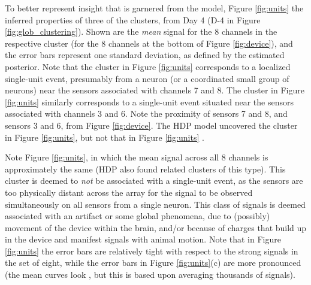 \documentclass[journal]{IEEEtran}
\begin{document}
To better represent insight that is garnered from the model,  Figure \ref{fig:units}  the inferred properties of three of the clusters, from Day 4 (D-4 in Figure \ref{fig:glob_clustering}). Shown are the \emph{mean} signal for the 8 channels in the respective cluster (for the 8 channels at the bottom of Figure \ref{fig:device}), and the error bars represent one standard deviation, as defined by the estimated posterior. Note that the cluster in  Figure \ref{fig:units} corresponds to a localized single-unit event, presumably from a neuron (or a coordinated small group of neurons) near the sensors associated with channels 7 and 8. The cluster in  Figure \ref{fig:units} similarly corresponds to a single-unit event situated near the sensors associated with channels 3 and 6. Note the proximity of sensors 7 and 8, and sensors 3 and 6, from Figure \ref{fig:device}. The HDP model uncovered the cluster in  Figure \ref{fig:units}, but not that in  Figure \ref{fig:units} .

Note  Figure \ref{fig:units}, in which the mean signal across all 8 channels is approximately the same (HDP also found related clusters of this type). This cluster is deemed to \emph{not} be associated with a single-unit event, as the sensors are too physically distant across the array for the signal to be observed simultaneously on all sensors from a single neuron. This class of signals is deemed associated with an artifact or some global phenomena, due to (possibly) movement of the device within the brain, and/or because of charges that build up in the device and manifest signals with animal motion. Note that in  Figure \ref{fig:units} the error bars are relatively tight with respect to the strong signals in the set of eight, while the error bars in Figure \ref{fig:units}(c) are more pronounced (the mean curves look , but this is based upon averaging thousands of signals).
\end{document}
